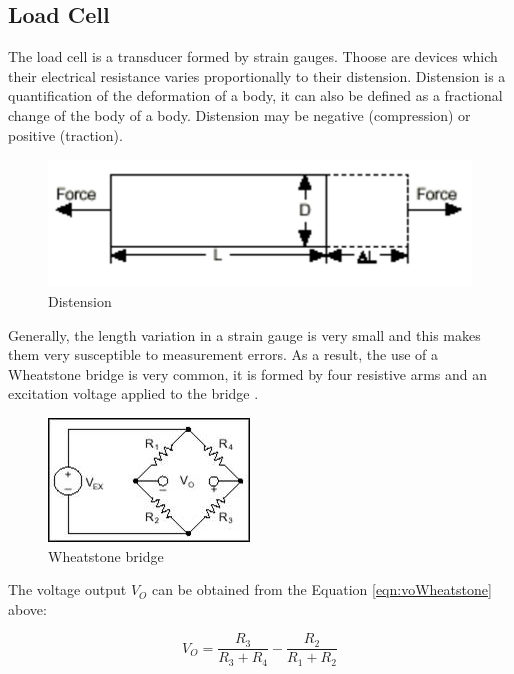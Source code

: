 \subsection{Load Cell}

	The load cell is a transducer formed by strain gauges. Thoose are devices which their electrical resistance varies proportionally to their distension. Distension is a quantification of the deformation of a body, it can also be defined as a fractional change of the body of a body. Distension may be negative (compression) or positive (traction).

	\begin{figure}[htbp]
		\centering
			\includegraphics[scale=0.6]{figuras/fig-distension.png}
		\caption{Distension \cite{strain-def}}
		\label{fig:distension}
	\end{figure}

	Generally, the length variation in a strain gauge is very small and this makes them very susceptible to measurement errors. As a result, the use of a Wheatstone bridge is very common, it is formed by four resistive arms and an excitation voltage applied to the bridge \cite{window1982strain}.

	\begin{figure}[htbp]
		\centering
			\includegraphics[scale=1.45]{figuras/fig-wheatstone.jpg}
		\caption{Wheatstone bridge \cite{wheat-bridge}}
		\label{fig:wheatstone}
	\end{figure}

	The voltage output $V_{O}$ can be obtained from the Equation \ref{eqn:voWheatstone} above:

	\begin{equation}\label{eqn:voWheatstone}
		V_{O}=\frac{ R_{3} }{ R_{3} + R_{4} } - \frac{ R_{2} }{ R_{1} + R_{2}}
	\end{equation}
